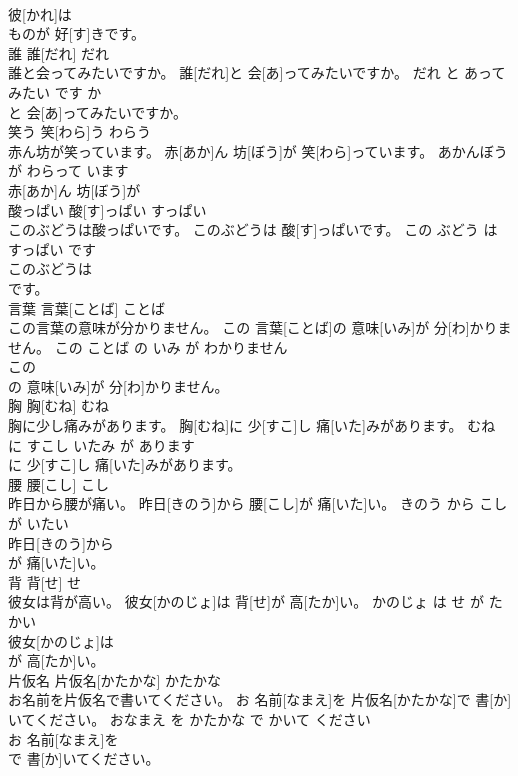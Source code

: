 \documentclass[8pt]{extreport}
\begin{document}
\begin{CJK}{UTF8}{min}
\\	彼[かれ]は
\\	ものが 好[す]きです。			
\\	誰	誰[だれ]	だれ	
\\	誰と会ってみたいですか。	誰[だれ]と 会[あ]ってみたいですか。	だれ と あって みたい です か	
\\	と 会[あ]ってみたいですか。			
\\	笑う	笑[わら]う	わらう	
\\	赤ん坊が笑っています。	赤[あか]ん 坊[ぼう]が 笑[わら]っています。	あかんぼう が わらって います	
\\	赤[あか]ん 坊[ぼう]が
\\	酸っぱい	酸[す]っぱい	すっぱい	
\\	このぶどうは酸っぱいです。	このぶどうは 酸[す]っぱいです。	この ぶどう は すっぱい です	
\\	このぶどうは
\\	です。			
\\	言葉	言葉[ことば]	ことば	
\\	この言葉の意味が分かりません。	この 言葉[ことば]の 意味[いみ]が 分[わ]かりません。	この ことば の いみ が わかりません	
\\	この
\\	の 意味[いみ]が 分[わ]かりません。			
\\	胸	胸[むね]	むね	
\\	胸に少し痛みがあります。	胸[むね]に 少[すこ]し 痛[いた]みがあります。	むね に すこし いたみ が あります	
\\	に 少[すこ]し 痛[いた]みがあります。			
\\	腰	腰[こし]	こし	
\\	昨日から腰が痛い。	昨日[きのう]から 腰[こし]が 痛[いた]い。	きのう から こし が いたい	
\\	昨日[きのう]から
\\	が 痛[いた]い。			
\\	背	背[せ]	せ	
\\	彼女は背が高い。	彼女[かのじょ]は 背[せ]が 高[たか]い。	かのじょ は せ が たかい	
\\	彼女[かのじょ]は
\\	が 高[たか]い。			
\\	片仮名	片仮名[かたかな]	かたかな	
\\	お名前を片仮名で書いてください。	お 名前[なまえ]を 片仮名[かたかな]で 書[か]いてください。	おなまえ を かたかな で かいて ください	
\\	お 名前[なまえ]を
\\	で 書[か]いてください。			

\end{CJK}
\end{document}
